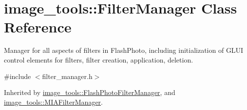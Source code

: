 \hypertarget{classimage__tools_1_1FilterManager}{}\section{image\+\_\+tools\+:\+:Filter\+Manager Class Reference}
\label{classimage__tools_1_1FilterManager}


Manager for all aspects of filters in Flash\+Photo, including initialization of G\+L\+UI control elements for filters, filter creation, application, deletion.  




{\ttfamily \#include $<$filter\+\_\+manager.\+h$>$}



Inherited by \hyperlink{classimage__tools_1_1FlashPhotoFilterManager}{image\+\_\+tools\+::\+Flash\+Photo\+Filter\+Manager}, and \hyperlink{classimage__tools_1_1MIAFilterManager}{image\+\_\+tools\+::\+M\+I\+A\+Filter\+Manager}.


